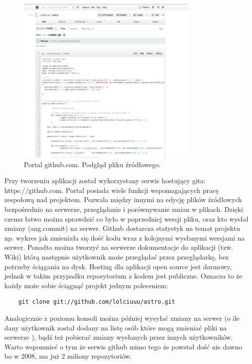 \begin{figure}[h]
    \centering
    \includegraphics[width=0.8\textwidth,natwidth=490,natheight=142]{./Pictures/git.png}
    \caption{Portal github.com. Podgląd pliku źródłowego. }
\end{figure}

Przy tworzeniu aplikacji został wykorzystany serwis hostujący gita: https://github.com. Portal posiada wiele funkcji wspomagających pracę zespołową nad projektem. Pozwala między innymi na edycję plików źródłowych bezpośrednio na serwerze, przeglądanie i porównywanie zmian w plikach. Dzięki czemu łatwo można sprawdzić co było w poprzedniej wersji pliku, oraz kto wysłał zmiany (ang.commit) na serwer. Github dostarcza statystyk na temat projektu np. wykres jak zmieniała się ilość kodu wraz z kolejnymi wysłanymi wersjami na serwer. Ponadto można tworzyć na serwerze dokumentacje do aplikacji (tzw. Wiki) którą następnie użytkownik może przeglądać przez przeglądarkę, bez potrzeby ściągania na dysk. Hosting dla aplikacji open source jest darmowy, jednak w takim przypadku repozytorium z kodem jest publiczne. Oznacza to że każdy może sobie ściągnąć projekt jednym poleceniem:

\begin{verbatim}
	git clone git://github.com/lolciuuu/astro.git
\end{verbatim}

Analogicznie z poziomu konsoli można później wysyłać zmiany na serwer (o ile dany użytkownik został dodany na listę osób które mogą zmieniać pliki na serwerze ), bądź też pobierać zmiany wysłanych przez innych użytkowników. Warto wspomnieć o tym że serwis github mimo tego że powstał dość nie dawno bo w 2008, ma już 2 miliony repozytoriów. 

